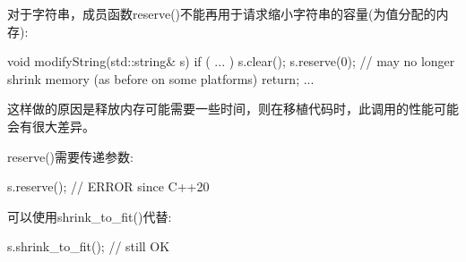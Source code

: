 
对于字符串，成员函数reserve()不能再用于请求缩小字符串的容量(为值分配的内存):

\begin{cpp}
void modifyString(std::string& s)
{
	if ( ... ) {
		s.clear();
		s.reserve(0); // may no longer shrink memory (as before on some platforms)
		return;
	}
	...
}
\end{cpp}

这样做的原因是释放内存可能需要一些时间，则在移植代码时，此调用的性能可能会有很大差异。

reserve()需要传递参数:

\begin{cpp}
s.reserve(); // ERROR since C++20
\end{cpp}

可以使用shrink\_to\_fit()代替:

\begin{cpp}
s.shrink_to_fit(); // still OK
\end{cpp}







